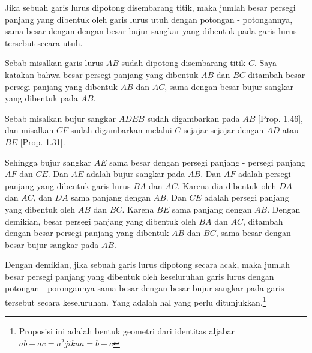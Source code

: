 \documentclass[a4paper]{book}
\begin{document}
Jika sebuah garis lurus dipotong disembarang titik, maka jumlah besar persegi
 panjang yang dibentuk oleh garis lurus utuh dengan potongan 
- potongannya, sama besar dengan dengan besar bujur sangkar yang dibentuk pada garis 
lurus tersebut secara utuh. 
\begin{center}
\end{center}
Sebab misalkan garis lurus $AB$ sudah dipotong disembarang titik $C$. Saya
katakan bahwa besar persegi panjang yang dibentuk $AB$ dan $BC$ ditambah besar persegi
panjang yang dibentuk $AB$ dan $AC$, sama dengan besar bujur sangkar yang dibentuk 
pada $AB$.

Sebab misalkan bujur sangkar $ADEB$ sudah digambarkan pada $AB$ [Prop. 1.46],
dan misalkan $CF$ sudah digambarkan melalui $C$ sejajar sejajar dengan 
$AD$ atau $BE$ [Prop. 1.31].

Sehingga bujur sangkar $AE$ sama besar dengan persegi panjang - persegi panjang 
$AF$ dan $CE$. Dan $AE$ adalah bujur sangkar pada $AB$. Dan $AF$ adalah persegi
panjang yang dibentuk garis lurus $BA$ dan $AC$. Karena dia dibentuk oleh $DA$
dan $AC$, dan $DA$ sama panjang dengan $AB$. Dan $CE$ adalah persegi panjang 
yang dibentuk oleh $AB$ dan $BC$. Karena $BE$ sama panjang dengan $AB$. Dengan
demikian, besar persegi panjang yang dibentuk oleh $BA$ dan $AC$, ditambah dengan besar
persegi panjang yang dibentuk $AB$ dan $BC$, sama besar dengan besar bujur sangkar pada
$AB$.

Dengan demikian, jika sebuah garis lurus dipotong secara acak, maka jumlah besar
persegi panjang yang dibentuk oleh keseluruhan garis lurus dengan potongan -
porongannya sama besar dengan besar bujur sangkar pada garis tersebut secara 
keseluruhan. Yang adalah hal yang perlu ditunjukkan.\footnote{Proposisi
ini adalah bentuk geometri dari identitas aljabar $ab + ac = a^2 jika
a  = b + c$}
 

\end{document}

